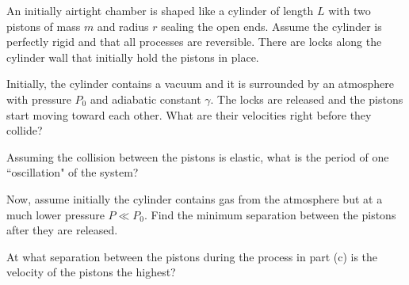 \documentclass[11pt]{scrartcl}
\begin{document}
\begin{prob}
    An initially airtight chamber is shaped like a cylinder of length $L$ with two pistons of mass $m$ and radius $r$ sealing the open ends. Assume the cylinder is perfectly rigid and that all processes are reversible. There are locks along the cylinder wall that initially hold the pistons in place. 
    \begin{anum}
        \item Initially, the cylinder contains a vacuum and it is surrounded by an atmosphere with pressure $P_0$ and adiabatic constant $\gamma$. The locks are released and the pistons start moving toward each other. What are their velocities right before they collide? 
        \item Assuming the collision between the pistons is elastic, what is the period of one ``oscillation" of the system?
        \item Now, assume initially the cylinder contains gas from the atmosphere but at a much lower pressure $P\ll P_0$. Find the minimum separation between the pistons after they are released. 
        \item At what separation between the pistons during the process in part (c) is the velocity of the pistons the highest?
    \end{anum}
\end{prob}
\end{document}
